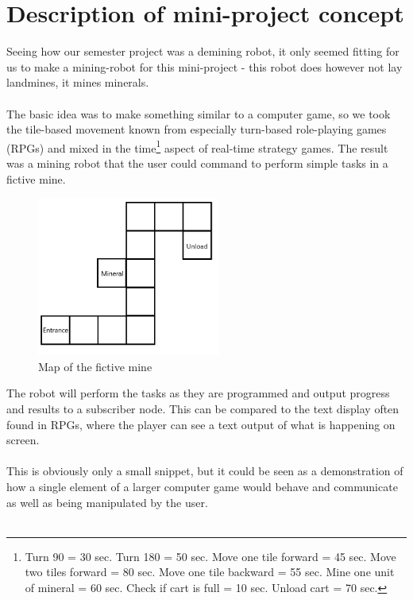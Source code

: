 \chapter{Description of mini-project concept}

Seeing how our semester project was a demining robot, it only seemed fitting for us to make a mining-robot for this mini-project - this robot does however not lay landmines, it mines minerals.\\
\\
The basic idea was to make something similar to a computer game, so we took the tile-based movement known from especially turn-based role-playing games (RPGs) and mixed in the time\footnote{Turn 90 \textdegree = 30 sec. Turn 180 \textdegree = 50 sec. Move one tile forward = 45 sec. Move two tiles forward = 80 sec. Move one tile backward = 55 sec. Mine one unit of mineral = 60 sec. Check if cart is full = 10 sec. Unload cart = 70 sec.} aspect of real-time strategy games. The result was a mining robot that the user could command to perform simple tasks in a fictive mine.

\begin{figure}[!ht]
  \centering
  \includegraphics[width=6cm]{RPro-Mini-Project-B332b/00 - Images/mineMap.png}
  \caption{Map of the fictive mine}
\end{figure}

The robot will perform the tasks as they are programmed and output progress and results to a subscriber node. This can be compared to the text display often found in RPGs, where the player can see a text output of what is happening on screen.\\
\\
This is obviously only a small snippet, but it could be seen as a demonstration of how a single element of a larger computer game would behave and communicate as well as being manipulated by the user.\\
\\